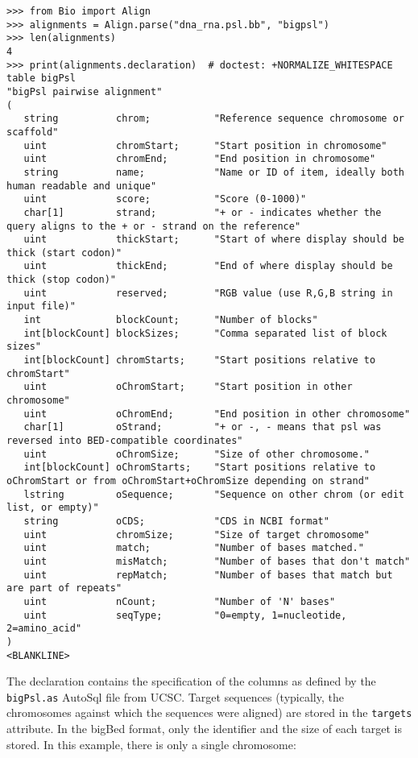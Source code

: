 \begin{verbatim}
>>> from Bio import Align
>>> alignments = Align.parse("dna_rna.psl.bb", "bigpsl")
>>> len(alignments)
4
>>> print(alignments.declaration)  # doctest: +NORMALIZE_WHITESPACE
table bigPsl
"bigPsl pairwise alignment"
(
   string          chrom;           "Reference sequence chromosome or scaffold"
   uint            chromStart;      "Start position in chromosome"
   uint            chromEnd;        "End position in chromosome"
   string          name;            "Name or ID of item, ideally both human readable and unique"
   uint            score;           "Score (0-1000)"
   char[1]         strand;          "+ or - indicates whether the query aligns to the + or - strand on the reference"
   uint            thickStart;      "Start of where display should be thick (start codon)"
   uint            thickEnd;        "End of where display should be thick (stop codon)"
   uint            reserved;        "RGB value (use R,G,B string in input file)"
   int             blockCount;      "Number of blocks"
   int[blockCount] blockSizes;      "Comma separated list of block sizes"
   int[blockCount] chromStarts;     "Start positions relative to chromStart"
   uint            oChromStart;     "Start position in other chromosome"
   uint            oChromEnd;       "End position in other chromosome"
   char[1]         oStrand;         "+ or -, - means that psl was reversed into BED-compatible coordinates"
   uint            oChromSize;      "Size of other chromosome."
   int[blockCount] oChromStarts;    "Start positions relative to oChromStart or from oChromStart+oChromSize depending on strand"
   lstring         oSequence;       "Sequence on other chrom (or edit list, or empty)"
   string          oCDS;            "CDS in NCBI format"
   uint            chromSize;       "Size of target chromosome"
   uint            match;           "Number of bases matched."
   uint            misMatch;        "Number of bases that don't match"
   uint            repMatch;        "Number of bases that match but are part of repeats"
   uint            nCount;          "Number of 'N' bases"
   uint            seqType;         "0=empty, 1=nucleotide, 2=amino_acid"
)
<BLANKLINE>
\end{verbatim}
The declaration contains the specification of the columns as defined by the \verb|bigPsl.as| AutoSql file from UCSC. Target sequences (typically, the chromosomes against which the sequences were aligned) are stored in the \verb|targets| attribute. In the bigBed format, only the identifier and the size of each target is stored. In this example, there is only a single chromosome: 
